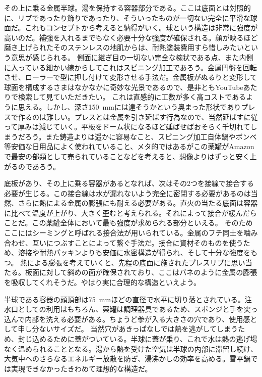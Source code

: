 \documentclass{sokuten}
\begin{document}
その上に乗る金属半球。湯を保持する容器部分である。ここは底面とは対照的に、リブであったり飾りであったり、そういったものが一切ない完全に平滑な球面だ。これもコンセプトから考えると納得がいく。球という構造は非常に強度が高いのだ。補強を入れるまでもなく必要十分な強度が確保される。顔が映るほど磨き上げられたそのステンレスの地肌からは、耐熱塗装費用すら惜しみたいという意思が感じられる。
側面に継ぎ目の一切ない完全な椀状である点、また内側に入っている細かい線からしてこれはスピニング加工であろう。金属円盤を回転させ、ローラーで型に押し付けて変形させる手法だ。金属板がぬるりと変形して球面を構成するさまはなかなかに奇妙な光景であるので、是非ともYouTubeあたりで検索して見ていただきたい。
これは直感的に工数が多く高コストであるように思える。しかし、深さ\SI{150}{\milli\m}には達そうかという奥まった形状でありプレスで作るのは難しい。プレスとは金属を引き延ばす行為なので、当然延ばすに従って厚みは減じていく。平板をドーム状になるほど延ばせばおそらく千切れてしまうだろう。また鋳造よりは遥かに容易なこと、スピニング加工自体鍋やボンベ等安価な日用品によく使われていること、メタ的ではあるがこの薬罐がAmazonで最安の部類として売られていることなどを考えると、想像よりはずっと安く上がるのであろう。

底板があり、その上に乗る容器があるとなれば、次はその2つを接線で接合する必要が生じる。この接合線は水が漏れないよう完全に密閉する必要があるのは当然、さらに熱による金属の膨張にも耐える必要がある。直火の当たる底面は容器に比べて温度が上がり、大きく歪むと考えられる。それによって接合が緩んだらことだ。この薬罐全体において最も強度が求められる部分といえる。
そのためここにはシーミングと呼ばれる接合法が用いられている。金属のフチ同士を噛み合わせ、互いにつぶすことによって繋ぐ手法だ。接合に資材そのものを使うため、溶接や耐熱パッキンよりも安価に水密構造が得られ、そして十分な強度をもつ。
熱による膨張を考えていくと、先程の底面に施されたプレスリブに思い当たる。板面に対して斜めの面が確保されており、ここはバネのように金属の膨張を吸収してくれそうだ。やはり実に合理的な構造といえよう。

半球である容器の頭頂部は\SI{75}{\milli\m}ほどの直径で水平に切り落とされている。注水口としての利用はもちろん、薬罐は調理器具であるため、スポンジと手を突っ込んで内部を洗える必要がある。ちょうど拳が入る大きさの穴であり、使用感として申し分ないサイズだ。
当然穴があきっぱなしでは熱を逃がしてしまうため、封じ込めるために蓋がついている。半球に蓋が乗り、これで水は熱の逃げ場なく温められることとなる。湯から熱を受けた空気は半球の内部に滞留し続け、大気中へのさらなるエネルギー放散を防ぎ、湯沸かしの効率を高める。雪平鍋では実現できなかったきわめて理想的な構造だ。
\end{document}
